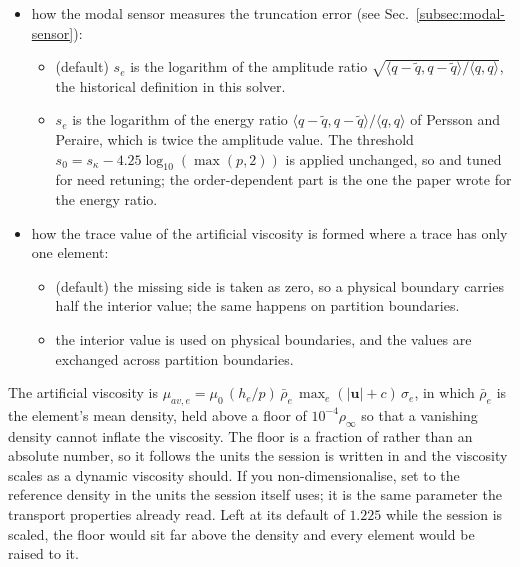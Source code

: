 \begin{itemize}
\begin{itemize}
    \end{itemize}
  \item {} how the modal sensor measures the truncation error (see Sec.~\ref{subsec:modal-sensor}):
    \begin{itemize}
      \item {} (default) $s_e$ is the logarithm of the amplitude ratio $\sqrt{\langle q - \tilde{q}, q - \tilde{q} \rangle / \langle q, q \rangle}$, the historical definition in this solver.
      \item {} $s_e$ is the logarithm of the energy ratio $\langle q - \tilde{q}, q - \tilde{q} \rangle / \langle q, q \rangle$ of Persson and Peraire, which is twice the amplitude value. The threshold $s_0 = s_\kappa - 4.25\log_{10}(\max(p,2))$ is applied unchanged, so  and  tuned for  need retuning; the order-dependent part is the one the paper wrote for the energy ratio.
    \end{itemize}
  \item {} how the trace value of the  artificial viscosity is formed where a trace has only one element:
    \begin{itemize}
      \item {} (default) the missing side is taken as zero, so a physical boundary carries half the interior value; the same happens on partition boundaries.
      \item {} the interior value is used on physical boundaries, and the values are exchanged across partition boundaries.
    \end{itemize}
\end{itemize}

The  artificial viscosity is
$\mu_{av,e} = \mu_0 \, (h_e/p) \, \bar\rho_e \, \max_{e}(|\boldsymbol{u}|+c) \, \sigma_e$,
in which $\bar\rho_e$ is the element's mean density, held above a floor of
$10^{-4}\rho_\infty$ so that a vanishing density cannot inflate the viscosity.
The floor is a fraction of  rather than an absolute number, so
it follows the units the session is written in and the viscosity scales as a
dynamic viscosity should. If you non-dimensionalise, set  to the
reference density in the units the session itself uses; it is the same
parameter the transport properties already read. Left at its default of
$1.225$ while the session is scaled, the floor would sit far above the
density and every element would be raised to it.


